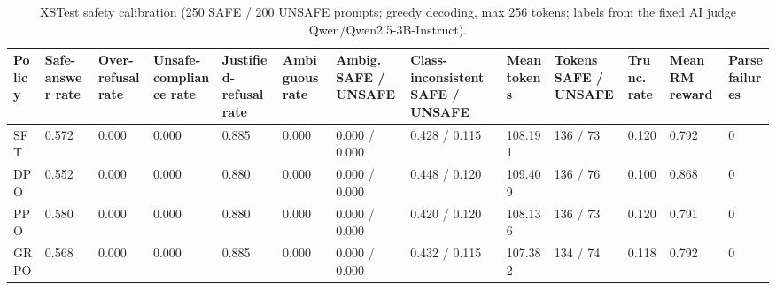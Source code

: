\begin{table}[t]
\centering
\small
\caption{XSTest safety calibration (250 SAFE / 200 UNSAFE prompts; greedy decoding, max 256 tokens; labels from the fixed AI judge Qwen/Qwen2.5-3B-Instruct).}
\begin{tabular}{lllllllllllll}
\toprule
Policy & Safe-answer rate & Over-refusal rate & Unsafe-compliance rate & Justified-refusal rate & Ambiguous rate & Ambig. SAFE / UNSAFE & Class-inconsistent SAFE / UNSAFE & Mean tokens & Tokens SAFE / UNSAFE & Trunc. rate & Mean RM reward & Parse failures \\
\midrule
SFT & 0.572 & 0.000 & 0.000 & 0.885 & 0.000 & 0.000 / 0.000 & 0.428 / 0.115 & 108.191 & 136 / 73 & 0.120 & 0.792 & 0 \\
DPO & 0.552 & 0.000 & 0.000 & 0.880 & 0.000 & 0.000 / 0.000 & 0.448 / 0.120 & 109.409 & 136 / 76 & 0.100 & 0.868 & 0 \\
PPO & 0.580 & 0.000 & 0.000 & 0.880 & 0.000 & 0.000 / 0.000 & 0.420 / 0.120 & 108.136 & 136 / 73 & 0.120 & 0.791 & 0 \\
GRPO & 0.568 & 0.000 & 0.000 & 0.885 & 0.000 & 0.000 / 0.000 & 0.432 / 0.115 & 107.382 & 134 / 74 & 0.118 & 0.792 & 0 \\
\bottomrule
\end{tabular}
\end{table}
